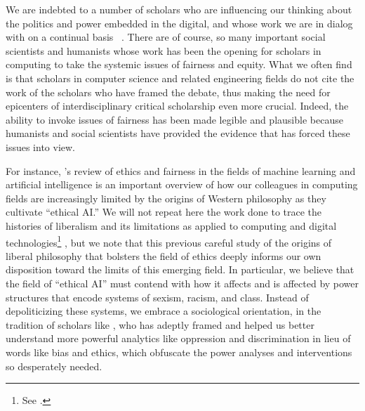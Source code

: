 \documentclass[11pt]{article}
\begin{document}
We are indebted to a number of scholars who are influencing our thinking about the politics and power embedded in the digital, and whose work we are in dialog with on a continual basis ~\cite{benjamin2019race,chun2008control,daniels2009cyber,eubanks2018automating,hoffmann2019fairness,noble2018algorithms,pasquale2016black,roberts2019behind,vaidhyanathan2006afterword,vaidhyanathan2018antisocial}. There are of course, so many important social scientists and humanists whose work has been the opening for scholars in computing to take the systemic issues of fairness and equity. What we often find is that scholars in computer science and related engineering fields do not cite the work of the scholars who have framed the debate, thus making the need for epicenters of interdisciplinary critical scholarship even more crucial. Indeed, the ability to invoke issues of fairness has been made legible and plausible because humanists and social scientists have provided the evidence that has forced these issues into view. 


For instance, \cite{binns2018fairness}'s  review of ethics and fairness in the fields of machine learning and artificial intelligence is an important overview of how our colleagues in computing fields are increasingly limited by the origins of Western philosophy as they cultivate “ethical AI.” We will not repeat here the work done to trace the histories of liberalism and its limitations as applied to computing and digital technologies\footnote{See \cite{BuiNoble}.} , but we note that this previous careful study of the origins of liberal philosophy that bolsters the field of ethics deeply informs our own disposition toward the limits of this emerging field. In particular, we believe that the field of “ethical AI” must contend with how it affects and is affected by power structures that encode systems of sexism, racism, and class. Instead of depoliticizing these systems, we embrace a sociological orientation, in the tradition of scholars like \cite{daniels2009cyber}, who has adeptly framed and helped us better understand more powerful analytics like oppression and discrimination in lieu of words like bias and ethics, which obfuscate the power analyses and interventions so desperately needed. 
\end{document}
